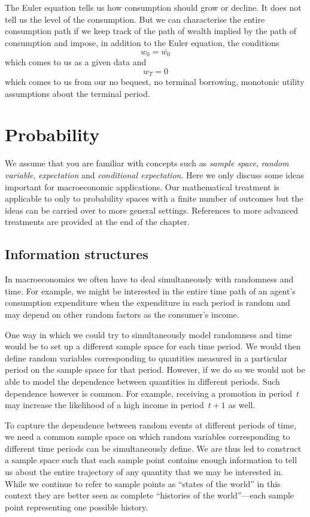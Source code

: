\documentclass[11pt,reqno,openany]{amsbook}
\begin{document}
The Euler equation tells us how consumption should grow or decline. It
does not tell us the level of the consumption. But we can characterise
the entire consumption path if we keep track of
the path of wealth implied by the path of consumption and impose, in
addition to the Euler equation, the
conditions
\[w_0 = \overline{w_0}\]
which comes to us as a given data and 
\[w_T=0\]
which comes to us from our no bequest, no terminal borrowing,
monotonic utility assumptions about the terminal period.

\chapter{Probability}\label{ch:probability}
We assume that you are familiar with concepts such as
\emph{sample space}, \emph{random variable},
\emph{expectation} and \emph{conditional expectation}. Here
we only discuss some ideas important for macroeconomic
applications. Our mathematical treatment is applicable to
only to probability spaces with a finite number of outcomes
but the ideas can be carried over to more general settings.
References to more advanced treatments are provided at
the end of the chapter.

\section{Information structures}
In macroeconomics we often have to deal
simultaneously with randomness and time. For example, we
might be interested in the entire time path of an agent's
consumption expenditure when the expenditure in each period
is random and may depend on other random factors as the
consumer's income. 

One way in which we could try to simultaneously model
randomness and time would be to set up a different sample
space for each time period. We would then define random variables
corresponding to quantities measured in a particular period
on the sample space for that period. However, if we do so we
would not be able to model the dependence between quantities
in different periods. Such dependence however is common. For
example, receiving a promotion in period~$t$ may increase
the likelihood of a high income in period~$t+1$ as well.

To capture the dependence between random events at different
periods of time, we need a common sample space on which
random variables corresponding to different time periods can
be simultaneously define. We are thus led to construct a
sample space such that each sample point contains enough
information to tell us about the entire trajectory of any
quantity that we may be interested in. While we continue to
refer to sample points as ``states of the world'' in this
context they are better seen as complete ``histories of the
world''---each sample point representing one possible
history.
\end{document}
